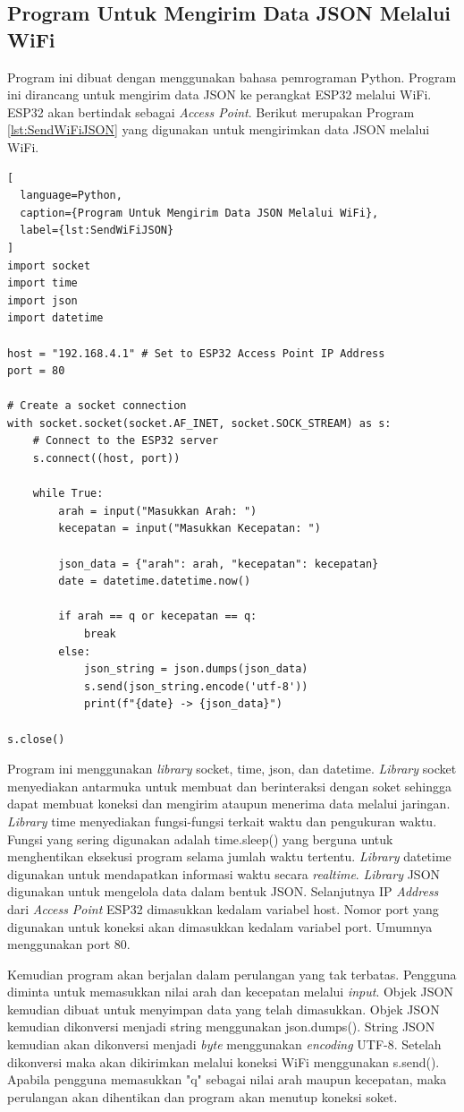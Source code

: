 \subsection{Program Untuk Mengirim Data JSON Melalui WiFi}

Program ini dibuat dengan menggunakan bahasa pemrograman Python. Program ini dirancang untuk mengirim data JSON ke perangkat ESP32 melalui WiFi. ESP32 akan bertindak sebagai \emph{Access Point}. Berikut merupakan Program \ref{lst:SendWiFiJSON} yang digunakan untuk mengirimkan data JSON melalui WiFi.

\begin{lstlisting}[
  language=Python,
  caption={Program Untuk Mengirim Data JSON Melalui WiFi},
  label={lst:SendWiFiJSON}
]
import socket
import time
import json
import datetime

host = "192.168.4.1" # Set to ESP32 Access Point IP Address
port = 80

# Create a socket connection
with socket.socket(socket.AF_INET, socket.SOCK_STREAM) as s:
    # Connect to the ESP32 server
    s.connect((host, port))
    
    while True:
        arah = input("Masukkan Arah: ")
        kecepatan = input("Masukkan Kecepatan: ")
        
        json_data = {"arah": arah, "kecepatan": kecepatan}
        date = datetime.datetime.now()
        
        if arah == q or kecepatan == q:
            break
        else:
            json_string = json.dumps(json_data)
            s.send(json_string.encode('utf-8'))
            print(f"{date} -> {json_data}")

s.close()
\end{lstlisting}
Program ini menggunakan \emph{library} socket, time, json, dan datetime. \emph{Library} socket menyediakan antarmuka untuk membuat dan berinteraksi dengan soket sehingga dapat membuat koneksi dan mengirim ataupun menerima data melalui jaringan. \emph{Library} time menyediakan fungsi-fungsi terkait waktu dan pengukuran waktu. Fungsi yang sering digunakan adalah time.sleep() yang berguna untuk menghentikan eksekusi program selama jumlah waktu tertentu. \emph{Library} datetime digunakan untuk mendapatkan informasi waktu secara \emph{realtime}. \emph{Library} JSON digunakan untuk mengelola data dalam bentuk JSON. Selanjutnya IP \emph{Address} dari \emph{Access Point} ESP32 dimasukkan kedalam variabel host. Nomor port yang digunakan untuk koneksi akan dimasukkan kedalam variabel port. Umumnya menggunakan port 80.

Kemudian program akan berjalan dalam perulangan yang tak terbatas. Pengguna diminta untuk memasukkan nilai arah dan kecepatan melalui \emph{input}. Objek JSON kemudian dibuat untuk menyimpan data yang telah dimasukkan. Objek JSON kemudian dikonversi menjadi string menggunakan json.dumps(). String JSON kemudian akan dikonversi menjadi \emph{byte} menggunakan \emph{encoding} UTF-8. Setelah dikonversi maka akan dikirimkan melalui koneksi WiFi menggunakan s.send(). Apabila pengguna memasukkan "q" sebagai nilai arah maupun kecepatan, maka perulangan akan dihentikan dan program akan menutup koneksi soket.
